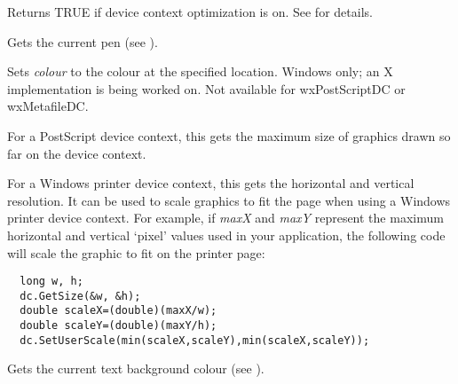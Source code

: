 
Returns TRUE if device context optimization is on.
See  for details.

\label{wxdcgetpen}


Gets the current pen (see ).

\label{wxdcgetpixel}


Sets {\it colour} to the colour at the specified location. Windows only; an X implementation
is being worked on. Not available for wxPostScriptDC or wxMetafileDC.

\label{wxdcgetsize}


For a PostScript device context, this gets the maximum size of graphics
drawn so far on the device context.

For a Windows printer device context, this gets the horizontal and vertical
resolution. It can be used to scale graphics to fit the page when using
a Windows printer device context. For example, if {\it maxX} and {\it maxY}\rtfsp
represent the maximum horizontal and vertical `pixel' values used in your
application, the following code will scale the graphic to fit on the
printer page:

\begin{verbatim}
  long w, h;
  dc.GetSize(&w, &h);
  double scaleX=(double)(maxX/w);
  double scaleY=(double)(maxY/h);
  dc.SetUserScale(min(scaleX,scaleY),min(scaleX,scaleY));
\end{verbatim}


\label{wxdcgettextbackground}


Gets the current text background colour (see ).

\label{wxdcgettextextent}


